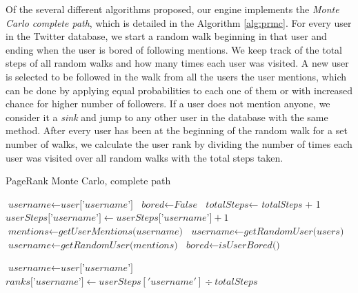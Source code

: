Of the several different algorithms proposed, our engine implements the
\emph{Monte Carlo complete path}, which is detailed in the Algorithm
\ref{alg:prmc}. For every user in the Twitter database, we start a random walk
beginning in that user and ending when the user is bored of following mentions.
We keep track of the total steps of all random walks and how many times each
user was visited. A new user is selected to be followed in the walk from all the
users the user mentions, which can be done by applying equal probabilities to
each one of them or with increased chance for higher number of followers. If a
user does not mention anyone, we consider it a \emph{sink} and jump to any other
user in the database with the same method. After every user has been at the
beginning of the random walk for a set number of walks, we calculate the user
rank by dividing the number of times each user was visited over all random walks
with the total steps taken.

\begin{algorithm}[H]
\caption{PageRank Monte Carlo, complete path}\label{alg:prmc}
\begin{algorithmic}
	\State $\textit{username} \gets \textit{user['username']}$
    \State $\textit{bored} \gets \textit{False}$
		\State $\textit{totalSteps} \gets $\textit{totalSteps} + 1
        \State $\textit{userSteps['username']} \gets \textit{userSteps['username']} + 1$
        \State $\textit{mentions} \gets \textit{getUserMentions(username)}$
                \State $\textit{username} \gets \textit{getRandomUser(users)}$
        \Else
     		\State $\textit{username} \gets \textit{getRandomUser(mentions)}$
        \EndIf
        \State $\textit{bored} \gets \textit{isUserBored()}$
    \EndWhile
\EndFor
\EndFor

	\State $\textit{username} \gets \textit{user['username']}$
	\State $\textit{ranks['username']} \gets userSteps['username'] \div totalSteps $
\EndFor

\State {}

\EndProcedure
\end{algorithmic}
\end{algorithm}
